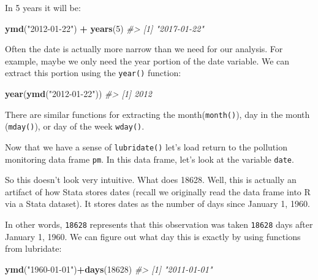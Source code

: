 \documentclass[
]{book}
\newenvironment{Shaded}{\begin{snugshade}}{\end{snugshade}}
\newcommand{\CommentTok}[1]{\textcolor[rgb]{0.56,0.35,0.01}{\textit{#1}}}
\newcommand{\DecValTok}[1]{\textcolor[rgb]{0.00,0.00,0.81}{#1}}
\newcommand{\FunctionTok}[1]{\textcolor[rgb]{0.13,0.29,0.53}{\textbf{#1}}}
\newcommand{\NormalTok}[1]{#1}
\newcommand{\SpecialCharTok}[1]{\textcolor[rgb]{0.81,0.36,0.00}{\textbf{#1}}}
\newcommand{\StringTok}[1]{\textcolor[rgb]{0.31,0.60,0.02}{#1}}
\begin{document}
In 5 years it will be:

\begin{Shaded}
\begin{Highlighting}[]
\FunctionTok{ymd}\NormalTok{(}\StringTok{"2012{-}01{-}22"}\NormalTok{) }\SpecialCharTok{+} \FunctionTok{years}\NormalTok{(}\DecValTok{5}\NormalTok{)}
\CommentTok{\#\textgreater{} [1] "2017{-}01{-}22"}
\end{Highlighting}
\end{Shaded}

Often the date is actually more narrow than we need for our analysis. For example, maybe we only need the year portion of the date variable. We can extract this portion using the \texttt{year()} function:

\begin{Shaded}
\begin{Highlighting}[]
\FunctionTok{year}\NormalTok{(}\FunctionTok{ymd}\NormalTok{(}\StringTok{"2012{-}01{-}22"}\NormalTok{))}
\CommentTok{\#\textgreater{} [1] 2012}
\end{Highlighting}
\end{Shaded}

There are similar functions for extracting the month(\texttt{month()}), day in the month (\texttt{mday()}), or day of the week \texttt{wday()}.

Now that we have a sense of \texttt{lubridate()} let's load return to the pollution monitoring data frame \texttt{pm}. In this data frame, let's look at the variable \texttt{date}.

\begin{Shaded}
\end{Shaded}

So this doesn't look very intuitive. What does 18628. Well, this is actually an artifact of how Stata stores dates (recall we originally read the data frame into R via a Stata dataset). It stores dates as the number of days since January 1, 1960.

In other words, \texttt{18628} represents that this observation was taken \texttt{18628} days after January 1, 1960. We can figure out what day this is exactly by using functions from lubridate:

\begin{Shaded}
\begin{Highlighting}[]
\FunctionTok{ymd}\NormalTok{(}\StringTok{"1960{-}01{-}01"}\NormalTok{)}\SpecialCharTok{+}\FunctionTok{days}\NormalTok{(}\DecValTok{18628}\NormalTok{)}
\CommentTok{\#\textgreater{} [1] "2011{-}01{-}01"}
\end{Highlighting}
\end{Shaded}
\end{document}

